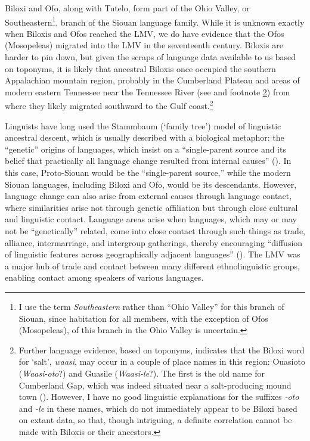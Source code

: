\documentclass[output=paper]{LSP/langsci}
\begin{document}
Biloxi and Ofo, along with Tutelo, form part of the Ohio Valley, or Southeastern\footnote{I use the term \emph{Southeastern} rather than “Ohio Valley” for this branch of Siouan, since habitation for all members, with the exception of Ofos (Mosopeleas), of this branch in the Ohio Valley is uncertain.}, branch of the Siouan language family. While it is unknown exactly when Biloxis and Ofos reached the LMV, we do have evidence that the Ofos (Mosopeleas) migrated into the LMV in the seventeenth century. Biloxis are harder to pin down, but given the scraps of language data available to us based on toponyms, it is likely that ancestral Biloxis once occupied the southern Appalachian mountain region, probably in the Cumberland Plateau and areas of modern eastern Tennessee near the Tennessee River (see \citealt{Rankin2011} and footnote \ref{waasi}) from where they likely migrated southward to the Gulf coast.\footnote{\label{waasi}Further language evidence, based on toponyms, indicates that the Biloxi word for `salt', \emph{waasi}, may occur in a couple of place names in this region: Ouasioto (\emph{Waasi-oto}?) and Guasile (\emph{Waasi-le}?). The first is the old name for Cumberland Gap, which was indeed situated near a salt-producing mound town (\citealt{Meyer1925}). However, I have no good linguistic explanations for the suffixes \emph{-oto} and \emph{-le} in these names, which do not immediately appear to be Biloxi based on extant data, so that, though intriguing, a definite correlation cannot be made with Biloxis or their ancestors.}

Linguists have long used the Stammbaum (`family tree') model of linguistic ancestral descent, which is usually described with a biological metaphor: the “genetic” origins of languages, which insist on a “single-parent source and its belief that practically all language change resulted from internal causes” (\citealt[7]{Winford2003}). In this case, Proto-Siouan would be the “single-parent source,” while the modern Siouan languages, including Biloxi and Ofo, would be its descendants. However, language change can also arise from external causes through language contact, where similarities arise not through genetic affiliation but through close cultural and linguistic contact. Language areas arise when languages, which may or may not be “genetically” related, come into close contact through such things as trade, alliance, intermarriage, and intergroup gatherings, thereby encouraging “diffusion of linguistic features across geographically adjacent languages” (\citealt[7]{Winford2003}). The LMV was a major hub of trade and contact between many different ethnolinguistic groups, enabling contact among speakers of various languages. 
\end{document}
